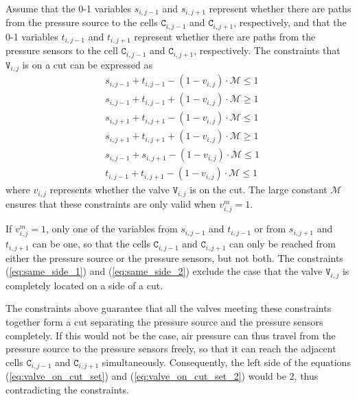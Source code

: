 Assume that the 0-1 variables 
$s_{i,j-1}$ and $s_{i,j+1}$ represent whether there are
paths from the pressure source to the cells $\mathtt{C}_{i,j-1}$ and
$\mathtt{C}_{i,j+1}$, respectively, and 
that the 0-1 variables 
$t_{i,j-1}$ and $t_{i,j+1}$ represent whether there are
paths from the pressure sensors to the cell $\mathtt{C}_{i,j-1}$ and
$\mathtt{C}_{i,j+1}$, respectively. The constraints that $\mathtt{V}_{i,j}$
is on a cut can be expressed as
\begin{align}
\label{eq:valve_on_cut_set}
&s_{i,j-1} + t_{i,j-1} -(1-v_{i,j})\cdot\mathcal{M} \le 1\\
&s_{i,j-1} + t_{i,j-1} +(1-v_{i,j})\cdot\mathcal{M}\ge 1\\
\label{eq:valve_on_cut_set_2}
&s_{i,j+1} + t_{i,j+1}-(1-v_{i,j})\cdot\mathcal{M} \le 1\\
&s_{i,j+1} + t_{i,j+1}+(1-v_{i,j})\cdot\mathcal{M} \ge 1\\
&s_{i,j-1} + s_{i,j+1}-(1-v_{i,j})\cdot\mathcal{M} \le 1 \label{eq:same_side_1}\\
&t_{i,j-1} + t_{i,j+1}-(1-v_{i,j})\cdot\mathcal{M} \le 1\label{eq:same_side_2}
\end{align}
where $v_{i,j}$ represents whether the valve $\mathtt{V}_{i,j}$ is on the cut. 
The large constant $\mathcal{M}$ ensures that these constraints are only
valid when $v_{i,j}^m=1$. 

If $v_{i,j}^m=1$, only one of the variables from 
$s_{i,j-1}$ and $t_{i,j-1}$ or from $s_{i,j+1}$ and $t_{i,j+1}$ can be one, so
that the cells $\mathtt{C}_{i,j-1}$ and $\mathtt{C}_{i,j+1}$ can only be
reached from either the pressure source or the pressure sensors, but not both.
The constraints (\ref{eq:same_side_1}) and (\ref{eq:same_side_2})
exclude the case that the valve $\mathtt{V}_{i,j}$ is completely located on a side of a cut. 

The constraints above guarantee that all the valves meeting these constraints
together form a cut separating the pressure source and the pressure sensors
completely. If this would not be the case, 
air pressure can thus travel from the pressure source to the pressure
sensors freely, so that it can reach the adjacent cells
$\mathtt{C}_{i,j-1}$ and $\mathtt{C}_{i,j+1}$
simultaneously. Consequently, the left side of the equations
(\ref{eq:valve_on_cut_set}) and (\ref{eq:valve_on_cut_set_2}) would be 2,
thus contradicting the constraints.

